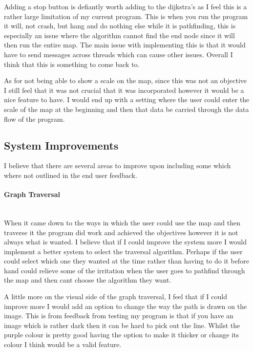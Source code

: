 \begin{flushleft}
    Adding a stop button is defiantly worth adding to the dijkstra's as I feel this is a rather large limitation of my current program. This is when you run the program it will, not crash, but hang and do nothing else while it is pathfinding, this is especially an issue where the algorithm cannot find the end node since it will then run the entire map. The main issue with implementing this is that it would have to send messages across threads which can cause other issues. Overall I think that this is something to come back to. \\ \bk

    As for not being able to show a scale on the map, since this was not an objective I still feel that it was not crucial that it was incorporated however it would be a nice feature to have. I would end up with a setting where the user could enter the scale of the map at the beginning and then that data be carried through the data flow of the program. \\ \bk

    \bk

    \subsection {System Improvements}
    I believe that there are several areas to improve upon including some which where not outlined in the end user feedback. \\ \bk

    \paragraph{Graph Traversal} \mbox{}\\
    When it came down to the ways in which the user could use the map and then traverse it the program did work and achieved the objectives however it is not always what is wanted. I believe that if I could improve the system more I would implement a better system to select the traversal algorithm. Perhaps if the user could select which one they wanted at the time rather than having to do it before hand could relieve some of the irritation when the user goes to pathfind through the map and then cant choose the algorithm they want. \\ \bk

    A little more on the visual side of the graph traversal, I feel that if I could improve more I would add an option to change the way the path is drawn on the image. This is from feedback from testing my program is that if you have an image which is rather dark then it can be hard to pick out the line. Whilst the purple colour is pretty good having the option to make it thicker or change its colour I think would be a valid feature. \\ \bk


\end{flushleft}

